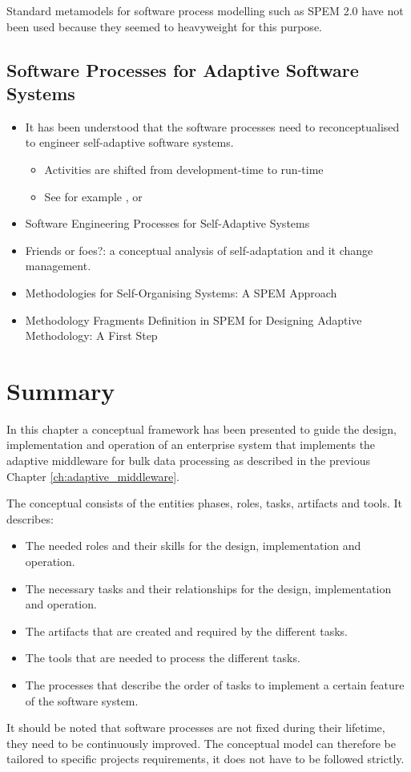 Standard metamodels for software process modelling such as \ac{SPEM} 2.0 have not been used because they seemed to heavyweight for this purpose.

\subsection{Software Processes for Adaptive Software Systems}

\begin{itemize}
	\item It has been understood that the software processes need to reconceptualised to engineer self-adaptive software systems.
	\begin{itemize}
		\item Activities are shifted from development-time to run-time
		\item See for example \cite{Blair:2009aa}, \cite{Inverardi:2008cz} or \cite{DeLemos:2013ty}
	\end{itemize}
\end{itemize}

\begin{itemize}
	\item Software Engineering Processes for Self-Adaptive Systems \citep{Andersson:2013aa}
	\item Friends or foes?: a conceptual analysis of self-adaptation and it change management. \citep{Gacek:2008ei}
	\item Methodologies for Self-Organising Systems: A SPEM Approach \citep{Puviani:2009kz}
	\item Methodology Fragments Definition in SPEM for Designing Adaptive Methodology: A First Step \citep{Rougemaille:2009ex}
\end{itemize}

\section{Summary}
\label{sec:ch6_summary}
In this chapter a conceptual framework has been presented to guide the design, implementation and operation of an enterprise system that implements the adaptive middleware for bulk data processing as described in the previous Chapter \ref{ch:adaptive_middleware}.

The conceptual consists of the entities phases, roles, tasks, artifacts and tools. It describes:
\begin{itemize}
	\item The needed roles and their skills for the design, implementation and operation.
	\item The necessary tasks and their relationships for the design, implementation and operation.
	\item The artifacts that are created and required by the different tasks.
	\item The tools that are needed to process the different tasks.
	\item The processes that describe the order of tasks to implement a certain feature of the software system.
\end{itemize}



It should be noted that software processes are not fixed during their lifetime, they need to be continuously improved. \citep{Fuggetta:2000ds}
The conceptual model can therefore be tailored to specific projects requirements, it does not have to be followed strictly.
